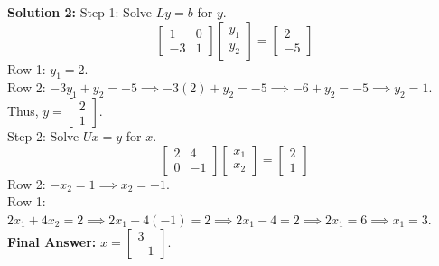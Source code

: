 \documentclass[11pt]{article}
\begin{document}
\vspace{0.5cm}
\textbf{Solution 2:}
Step 1: Solve $Ly = b$ for $y$.
$$ \begin{bmatrix} 1 & 0 \\ -3 & 1 \end{bmatrix} \begin{bmatrix} y_1 \\ y_2 \end{bmatrix} = \begin{bmatrix} 2 \\ -5 \end{bmatrix} $$
Row 1: $y_1 = 2$. \\
Row 2: $-3y_1 + y_2 = -5 \implies -3(2) + y_2 = -5 \implies -6 + y_2 = -5 \implies y_2 = 1$. \\
Thus, $y = \begin{bmatrix} 2 \\ 1 \end{bmatrix}$. \\
Step 2: Solve $Ux = y$ for $x$.
$$ \begin{bmatrix} 2 & 4 \\ 0 & -1 \end{bmatrix} \begin{bmatrix} x_1 \\ x_2 \end{bmatrix} = \begin{bmatrix} 2 \\ 1 \end{bmatrix} $$
Row 2: $-x_2 = 1 \implies x_2 = -1$. \\
Row 1: $2x_1 + 4x_2 = 2 \implies 2x_1 + 4(-1) = 2 \implies 2x_1 - 4 = 2 \implies 2x_1 = 6 \implies x_1 = 3$. \\
\textbf{Final Answer:} $x = \begin{bmatrix} 3 \\ -1 \end{bmatrix}$.
\end{document}
